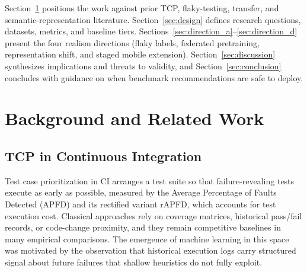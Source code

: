 \documentclass[10pt,conference]{IEEEtran}
\begin{document}
Section~\ref{sec:background} positions the work against prior TCP, flaky-testing, transfer, and semantic-representation literature. Section~\ref{sec:design} defines research questions, datasets, metrics, and baseline tiers. Sections~\ref{sec:direction_a}--\ref{sec:direction_d} present the four realism directions (flaky labels, federated pretraining, representation shift, and staged mobile extension). Section~\ref{sec:discussion} synthesizes implications and threats to validity, and Section~\ref{sec:conclusion} concludes with guidance on when benchmark recommendations are safe to deploy.

\section{Background and Related Work}\label{sec:background}

\subsection{TCP in Continuous Integration}

Test case prioritization in CI arranges a test suite so that failure-revealing tests execute as early as possible, measured by the Average Percentage of Faults Detected (APFD) and its rectified variant rAPFD, which accounts for test execution cost. Classical approaches rely on coverage matrices, historical pass/fail records, or code-change proximity, and they remain competitive baselines in many empirical comparisons. The emergence of machine learning in this space was motivated by the observation that historical execution logs carry structured signal about future failures that shallow heuristics do not fully exploit.
\end{document}
